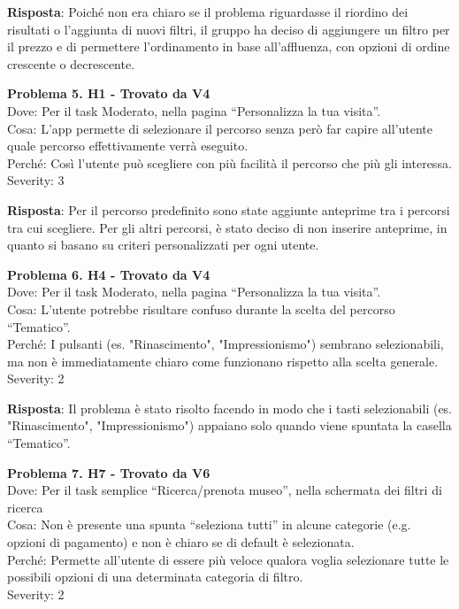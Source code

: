 \documentclass{article}
\begin{document}
\noindent \textbf{Risposta}: Poiché non era chiaro se il problema riguardasse il riordino dei risultati o l’aggiunta di nuovi filtri, il gruppo ha deciso di aggiungere un filtro per il prezzo e di permettere l'ordinamento in base all’affluenza, con opzioni di ordine crescente o decrescente.

\noindent \textbf{Problema 5. H1 - Trovato da V4} \\
Dove: Per il task Moderato, nella pagina “Personalizza la tua visita”. \\
Cosa: L'app permette di selezionare il percorso senza però far capire all’utente quale percorso effettivamente verrà eseguito. \\
Perché: Così l’utente può scegliere con più facilità il percorso che più gli interessa. \\
Severity: 3

\noindent \textbf{Risposta}: Per il percorso predefinito sono state aggiunte anteprime tra i percorsi tra cui scegliere. Per gli altri percorsi, è stato deciso di non inserire anteprime, in quanto si basano su criteri personalizzati per ogni utente.

\noindent \textbf{Problema 6. H4 - Trovato da V4} \\
Dove: Per il task Moderato, nella pagina “Personalizza la tua visita”. \\
Cosa: L’utente potrebbe risultare confuso durante la scelta del percorso “Tematico”. \\
Perché: I pulsanti (es. "Rinascimento", "Impressionismo") sembrano selezionabili, ma non è immediatamente chiaro come funzionano rispetto alla scelta generale. \\
Severity: 2

\noindent \textbf{Risposta}: Il problema è stato risolto facendo in modo che i tasti selezionabili (es. "Rinascimento", "Impressionismo") appaiano solo quando viene spuntata la casella “Tematico”.

\noindent \textbf{Problema 7. H7 - Trovato da V6} \\
Dove: Per il task semplice “Ricerca/prenota museo”, nella schermata dei filtri di ricerca \\
Cosa: Non è presente una spunta “seleziona tutti” in alcune categorie (e.g. opzioni di pagamento) e non è chiaro se di default è selezionata. \\
Perché: Permette all’utente di essere più veloce qualora voglia selezionare tutte le possibili opzioni di una determinata categoria di filtro. \\
Severity: 2
\end{document}
